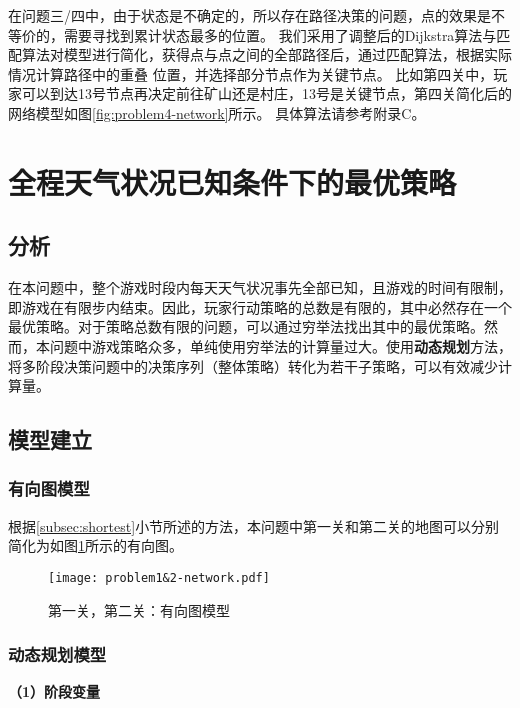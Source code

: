 \documentclass[bwprint]{cumcmthesis} %
\begin{document}
在问题三/四中，由于状态是不确定的，所以存在路径决策的问题，点的效果是不等价的，需要寻找到累计状态最多的位置。
我们采用了调整后的Dijkstra算法与匹配算法对模型进行简化，获得点与点之间的全部路径后，通过匹配算法，根据实际情况计算路径中的重叠
位置，并选择部分节点作为关键节点。
比如第四关中，玩家可以到达13号节点再决定前往矿山还是村庄，13号是关键节点，第四关简化后的网络模型如图\ref{fig:problem4-network}所示。
具体算法请参考附录C。






\section{全程天气状况已知条件下的最优策略}
\label{sec:simulate}

\subsection{分析}
在本问题中，整个游戏时段内每天天气状况事先全部已知，且游戏的时间有限制，即游戏在有限步内结束。因此，玩家行动策略的总数是有限的，其中必然存在一个最优策略。对于策略总数有限的问题，可以通过穷举法找出其中的最优策略。然而，本问题中游戏策略众多，单纯使用穷举法的计算量过大。使用\textbf{动态规划}方法，将多阶段决策问题中的决策序列（整体策略）转化为若干子策略，可以有效减少计算量。

\subsection{模型建立}
\subsubsection{有向图模型}
根据\ref{subsec:shortest}小节所述的方法，本问题中第一关和第二关的地图可以分别简化为如图\ref{fig:problem1-2-network.pdf}所示的有向图。
\begin{figure}[!h]
    \centering
    \texttt{[image: problem1\&2-network.pdf]}
    \caption{第一关，第二关：有向图模型}
    \label{fig:problem1-2-network.pdf}
\end{figure}

\subsubsection{动态规划模型}\label{dp}
\textbf{（1）阶段变量}
\end{document}
